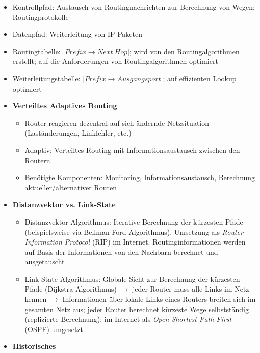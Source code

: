 \begin{itemize}
	\item Kontrollpfad: Austausch von Routingnachrichten zur Berechnung von Wegen; Routingprotokolle
	\item Datenpfad: Weiterleitung von IP-Paketen
	\item Routingtabelle: \(\big\lbrack Prefix \rightarrow Next~Hop\big\rbrack \); wird von den Routingalgorithmen erstellt; auf die Anforderungen von Routingalgorithmen optimiert
	\item Weiterleitungstabelle: \(\big\lbrack Prefix \rightarrow Ausgangsport\big\rbrack\); auf effizienten Lookup optimiert
	\item \textbf{Verteiltes Adaptives Routing}
	\begin{itemize}
		\item Router reagieren dezentral auf sich ändernde Netzsituation (Laständerungen, Linkfehler, etc.)
		\item Adaptiv: Verteiltes Routing mit Informationsaustausch zwischen den Routern
		\item Benötigte Komponenten: Monitoring, Informationsaustausch, Berechnung aktueller/alternativer Routen
	\end{itemize}
	\item \textbf{Distanzvektor vs. Link-State}
	\begin{itemize}
		\item Distanzvektor-Algorithmus: Iterative Berechnung der kürzesten Pfade (beispielsweise via Bellman-Ford-Algorithmus). Umsetzung als \textit{Router Information Protocol} (RIP) im Internet. Routinginformationen werden auf Basis der Informationen von den Nachbarn berechnet und ausgetauscht
		\item Link-State-Algorithmus: Globale Sicht zur Berechnung der kürzesten Pfade (Dijkstra-Algorithmus) \(\rightarrow\) jeder Router muss alle Links im Netz kennen \(\rightarrow\) Informationen über lokale Links eines Routers breiten sich im gesamten Netz aus; jeder Router berechnet kürzeste Wege selbstständig (replizierte Berechnung); im Internet als \textit{Open Shortest Path First} (OSPF) umgesetzt
	\end{itemize}
	\item \textbf{Historisches}
\end{itemize}
